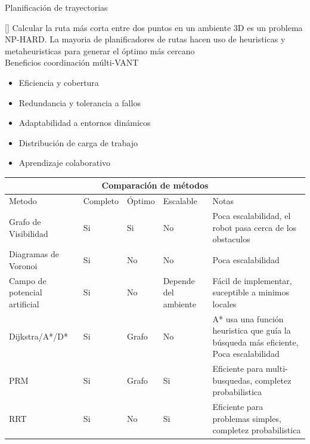 \documentclass[
	11pt, %
	aspectratio=169, %
]{beamer}
\begin{document}
\begin{frame}{Planificación de trayectorias}

  \cite{nphard}[] Calcular la ruta más corta entre dos puntos en un ambiente 3D es un problema NP-HARD. La mayoria de planificadores de rutas hacen uso de heuristicas y metaheuristicas para generar el óptimo más cercano \\
  \bigskip %
  Beneficios coordinación múlti-VANT
  \begin{itemize}
  \item Eficiencia y cobertura
  \item Redundancia y tolerancia a fallos
  \item Adaptabilidad a entornos dinámicos
  \item Distribución de carga de trabajo
  \item Aprendizaje colaborativo
  \end{itemize}
\end{frame}

\begin{frame}{}
  \centering
  \begin{tabular}{ |p{1.5cm}||p{0.8cm}|p{0.8cm}|p{1.2cm}|p{5cm}|  }
    \hline
    \multicolumn{5}{|c|}{\tiny Comparaci\'{o}n de m\'{e}todos} \\
    \hline 
    \tiny Metodo& \tiny Completo & \tiny \'{O}ptimo& \tiny Escalable& \tiny Notas \\
    \hline
    \tiny Grafo de Visibilidad   & \tiny Si    & \tiny Si&   \tiny No& \tiny Poca escalabilidad, el robot pasa cerca de los obstaculos\\
    \hline
    \tiny Diagramas de Voronoi   & \tiny Si    & \tiny No&   \tiny No& \tiny Poca escalabilidad\\
    \hline
    \tiny Campo de potencial artificial & \tiny Si    & \tiny No&   \tiny Depende del ambiente& \tiny F\'{a}cil de implementar, suceptible a minimos locales\\
    \hline
    \tiny Dijkstra/A*/D* & \tiny Si    & \tiny Grafo&   \tiny No& \tiny A* usa una función heuristica que guía la búsqueda más eficiente, Poca escalabilidad\\
    \hline
    \tiny PRM   & \tiny Si    & \tiny Grafo&   \tiny Si&  \tiny Eficiente para multi-busquedas, completez probabilistica \\
    \hline
    \tiny RRT   & \tiny Si    & \tiny No&   \tiny Si&  \tiny Eficiente para problemas simples, completez probabilistica\\
    \hline
  \end{tabular}  
\end{frame}
\end{document}
